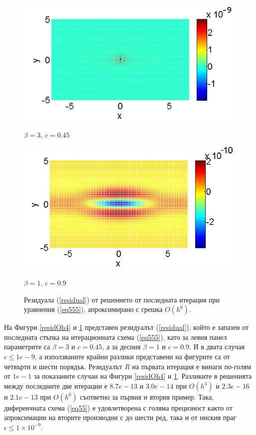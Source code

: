 \documentclass[a4paper]{article}
\newcommand{\rf}[1]{(\ref{#1})}
\theoremstyle{remark}
\begin{document}
\begin{large}
\begin{figure}[ht]
	\begin{minipage}[b]{0.45\linewidth}
		\raggedleft
		\includegraphics[width=\linewidth]{residual/residual_bt3c045_Oh6.png}
		\centerline{$\beta = 3$, $c = 0.45$}	
	\end{minipage}	
	\begin{minipage}[b]{0.41625\linewidth}	
		 \includegraphics[width=\linewidth]{residual/residual_bt1c090_Oh6.png}
		\centerline{$\beta = 1$, $c = 0.9$ }
	\end{minipage}

	\caption{Резидуала \rf{residual} от решението от последната итерация при уравнения \rf{eq555}, апроксимирано с грешка  $O(h^6)$. }
	\label{residOh6}
\end{figure}
\FloatBarrier
На Фигури \ref{residOh4} и \ref{residOh6} представен резидуалът \rf{residual}, който е запазен от последната стъпка на итерационната схема \rf{eq555}, като за левия панел  параметрите са $\beta = 3$ и $c = 0.45$, а за десния $\beta = 1$ и $c = 0.9$. И в двата случая $\epsilon \le 1e-9$, а използваните крайни разлики представени на фигурите са от четвърти и шести порядък. Резидуалът $R$ на първата итерация е винаги по-голям от $1e-1$ за показаните случаи на Фигури \ref{residOh4} и \ref{residOh6}. 
Разликите в решенията между последните две итерации е $8.7e-13$ и $3.0e-14$ при $O(h^4)$ и $2.3e-16$ и $2.1e-13$ при $O(h^6)$ съответно за първия и втория пример. Така, диференчната схема \rf{eq55} е удовлетворена с голяма прецизност както от апроксимации на вторите производни с до шести ред, така и от ниския праг $\epsilon \le 1\times10^{-9}$. 


\end{large}
\end{document}
